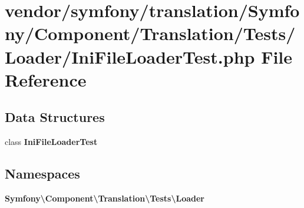 \section{vendor/symfony/translation/\+Symfony/\+Component/\+Translation/\+Tests/\+Loader/\+Ini\+File\+Loader\+Test.php File Reference}
\label{_ini_file_loader_test_8php}
\subsection*{Data Structures}
\begin{DoxyCompactItemize}
\item 
class {\bf Ini\+File\+Loader\+Test}
\end{DoxyCompactItemize}
\subsection*{Namespaces}
\begin{DoxyCompactItemize}
\item 
 {\bf Symfony\textbackslash{}\+Component\textbackslash{}\+Translation\textbackslash{}\+Tests\textbackslash{}\+Loader}
\end{DoxyCompactItemize}

